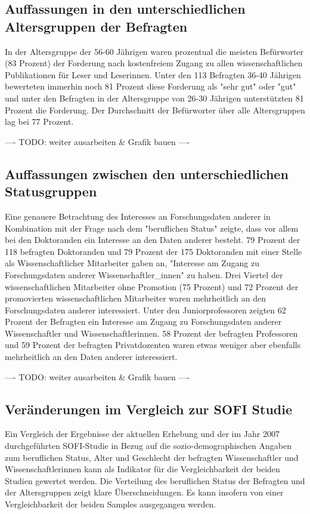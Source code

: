 \subsection{Auffassungen in den unterschiedlichen Altersgruppen der Befragten}

In der Altersgruppe der 56-60 Jährigen waren prozentual die meisten Befürworter (83 Prozent) der Forderung nach kostenfreiem Zugang zu allen wissenschaftlichen Publikationen für Leser und Leserinnen. Unter den 113 Befragten 36-40 Jährigen bewerteten immerhin noch 81 Prozent diese Forderung als "sehr gut" oder "gut" und unter den Befragten in der Altersgruppe von 26-30 Jährigen unterstützten 81 Prozent die Forderung. Der Durchschnitt der Befürworter über alle Altersgruppen lag bei 77 Prozent.

---- TODO: weiter ausarbeiten & Grafik bauen ----

\subsection{Auffassungen zwischen den unterschiedlichen Statusgruppen}

Eine genauere Betrachtung des Interesses an Forschungsdaten anderer in Kombination mit der Frage nach dem "beruflichen Status" zeigte, dass vor allem bei den Doktoranden ein Interesse an den Daten anderer besteht. 79 Prozent der 118 befragten Doktoranden und 79 Prozent der 175 Doktoranden mit einer Stelle als Wissenschaftlicher Mitarbeiter gaben an, "Interesse am Zugang zu Forschungsdaten anderer Wissenschaftler_innen" zu haben. Drei Viertel der wissenschaftlichen Mitarbeiter ohne Promotion (75 Prozent) und 72 Prozent der promovierten wissenschaftlichen Mitarbeiter waren mehrheitlich an den Forschungsdaten anderer interessiert. Unter den Juniorprofessoren zeigten 62 Prozent der Befragten ein Interesse am Zugang zu Forschungsdaten anderer Wissenschaftler und Wissenschaftlerinnen. 58 Prozent der befragten Professoren und 59 Prozent der befragten Privatdozenten waren etwas weniger aber ebenfalls mehrheitlich an den Daten anderer interessiert.

---- TODO: weiter ausarbeiten &  Grafik bauen ----

\subsection{Veränderungen im Vergleich zur SOFI Studie}

Ein Vergleich der Ergebnisse der aktuellen Erhebung und der im Jahr 2007 durchgeführten SOFI-Studie in Bezug auf die sozio-demographischen Angaben zum beruflichen Status, Alter und Geschlecht der befragten Wissenschaftler und Wissenschaftlerinnen kann als Indikator für die Vergleichbarkeit der beiden Studien gewertet werden. Die Verteilung des beruflichen Status der Befragten und der Altersgruppen zeigt klare Überschneidungen. Es kann insofern von einer Vergleichbarkeit der beiden Samples ausgegangen werden.

